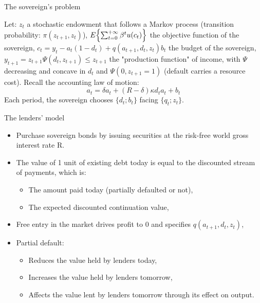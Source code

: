 \documentclass{beamer}
\begin{document}
\begin{frame}{The sovereign's problem}

Let:
\smallbreak
\(z_t\) a stochastic endowment that follows a Markov process (transition probability: \(\pi(z_{t+1},z_t)\)),
\smallbreak    
\(E \Bigl\{ \sum_{t=0}^{+\infty} \beta^t u(c_t)\Bigr\}\) the objective function of the sovereign,
\smallbreak    
\(c_t=y_t-a_t(1-d_t)+q(a_{t+1},d_t,z_t)b_t\) the budget of the sovereign,
\smallbreak    
\(y_{t+1}=z_{t+1}\Psi(d_t,z_{t+1})\leq z_{t+1}\) the "production function" of income, with \(\Psi\) decreasing and concave in \(d_t\) and \(\Psi(0, z_{t+1}=1)\) (default carries a resource cost).
\bigbreak
Recall the accounting law of motion:
\[
  a_t
  = \delta a_t
  + (R-\delta)\kappa d_t a_t
  + b_t
  \]
Each period, the sovereign chooses \(\{d_t;b_t\}\) facing \(\{q_t;z_t\}\).

\end{frame}

\begin{frame}{The lenders' model}

    \begin{itemize}
        \item Purchase sovereign bonds by issuing securities at the risk-free world gross interest rate R.
        \item The value of 1 unit of existing debt today is equal to the discounted stream of payments, which is:
        \begin{itemize}
            \item The amount paid today (partially defaulted or not),
            \item The expected discounted continuation value,
        \end{itemize} 
        \item Free entry in the market drives profit to 0 and specifies \(q(a_{t+1},d_t,z_t)\),
        \item Partial default:
        \begin{itemize}
            \item Reduces the value held by lenders today,
        \item Increases the value held by lenders tomorrow,
        \item Affects the value lent by lenders tomorrow through its effect on output.
        \end{itemize}
    \end{itemize}

\end{frame}
\end{document}
